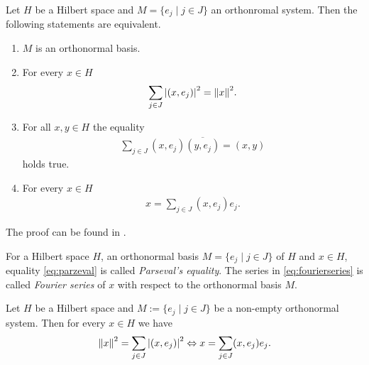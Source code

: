 \begin{theorem}
	Let $H$ be a Hilbert space and $M = \{e_j \mid j \in J\}$ an orthonromal system. Then the following statements are equivalent.
	\begin{enumerate}
		\item $M$ is an orthonormal basis.
		
		\item For every $x \in H$
		\begin{align}\label{eq:parzeval}
		\sum_{j \in J} \vbraces{(x, e_j)}^2 = \norm[]{x}^2.
		\end{align}
		
		\item For all $x,y \in H$ the equality
		\begin{align*}
			\sum_{j \in J} (x, e_j) \overline{(y,e_j)} = (x,y)
		\end{align*}
		holds true.
		
		\item For every $x \in H$  
		\begin{align} \label{eq:fourierseries}
		x = \sum_{j \in J} (x, e_j) e_j.
		\end{align}
	\end{enumerate} 
\end{theorem}

The proof can be found in \cite[p. 54]{FAna1}.


\begin{definition}
	For a Hilbert space $H$, an orthonormal basis $M = \{e_j \mid j \in J\}$ of $H$ and $x \in H$, equality \eqref{eq:parzeval} is called \textit{Parseval's equality}. The series in \eqref{eq:fourierseries} is called \textit{Fourier series} of $x$ with respect to the orthonormal basis $M$. 
\end{definition}


\begin{lemma}
	Let $H$ be a Hilbert space and $M := \{e_j \mid j \in J\}$ be a non-empty orthonormal system. Then for every $x \in H$ we have
	\begin{align}
		\norm[]{x}^2 = \sum_{j \in J} \vbraces{(x, e_j)}^2 \Leftrightarrow x = \sum_{j \in J} (x,e_j) e_j. \label{eq:parceval_to_fourier}
	\end{align}
\end{lemma}

